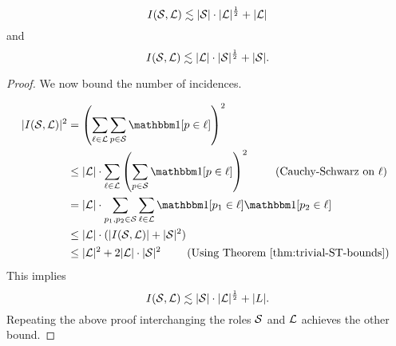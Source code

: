 \begin{theorem}
    $$I(\mathcal S,\mathcal L) \lesssim |\mathcal S|\cdot |\mathcal L|^{\frac{1}{2}} + |\mathcal L|$$
    and
    $$I(\mathcal S,\mathcal L) \lesssim |\mathcal L|\cdot |\mathcal S|^{\frac{1}{2}} + |\mathcal S|.$$
    \label{thm:pretty-trivial-ST-bounds}
\end{theorem}
\begin{proof}
    


We now bound the number of incidences. 

\begin{align*}
    |I(\ES,\LL)|^2 &= \left( \sum_{\ell \in \LL} \sum_{p \in \ES} \OO[p\in \ell] \right)^2 \\
    & \leq |\LL|\cdot \sum_{\ell \in \LL} \left( \sum_{p \in \ES} \OO[p\in \ell] \right)^2  \qquad \text{ (Cauchy-Schwarz on $\ell$)}\\
    &= |\LL|\cdot \sum_{p_1,p_2 \in \ES} \sum_{\ell \in \LL}   \OO[p_1\in \ell] \OO[p_2\in \ell]    \\
    & \leq |\LL|\cdot ( |I(\ES,\LL)| + |\ES|^2)\\ 
    &\leq |\LL|^2 + 2|\LL|\cdot |\ES|^2 \qquad \text{ (Using Theorem \ref{thm:trivial-ST-bounds}) }\\ 
\end{align*}    
This implies
$$I(\mathcal S,\mathcal L) \lesssim |\mathcal S|\cdot |\mathcal L|^{\frac{1}{2}} + |L|.$$ 
Repeating the above proof interchanging the roles $\mathcal S$ and $\mathcal L$ achieves the other bound.
\end{proof}


